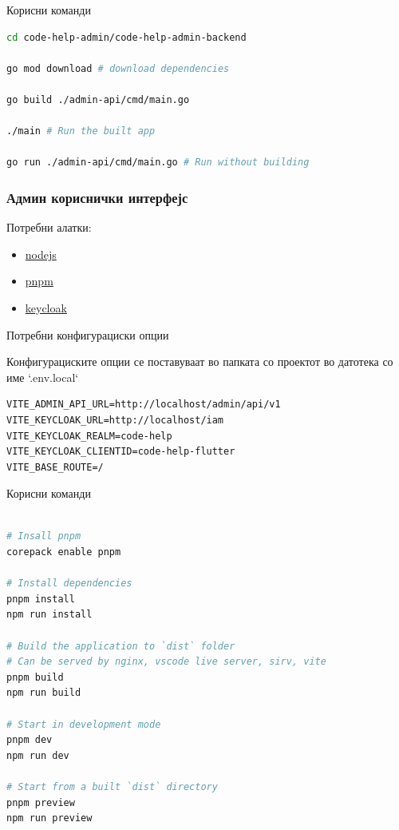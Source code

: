 \documentclass{article}
\begin{document}
Корисни команди
\begin{lstlisting}[language=sh]
cd code-help-admin/code-help-admin-backend

go mod download # download dependencies

go build ./admin-api/cmd/main.go

./main # Run the built app

go run ./admin-api/cmd/main.go # Run without building

\end{lstlisting}

\subsubsection{Админ кориснички интерфејс}

Потребни алатки:
\begin{itemize}
\item \href{https://nodejs.org/en}{nodejs}
\item \href{https://pnpm.io/installation}{pnpm}
\item \href{https://www.keycloak.org/}{keycloak}
\end{itemize}

Потребни конфигурациски опции

Конфигурациските опции се поставуваат во папката со проектот во датотека со име `.env.local`


\begin{lstlisting}[language=.env]
VITE_ADMIN_API_URL=http://localhost/admin/api/v1  
VITE_KEYCLOAK_URL=http://localhost/iam  
VITE_KEYCLOAK_REALM=code-help  
VITE_KEYCLOAK_CLIENTID=code-help-flutter  
VITE_BASE_ROUTE=/
\end{lstlisting}

Корисни команди
\begin{lstlisting}[language=sh]

# Insall pnpm
corepack enable pnpm 

# Install dependencies
pnpm install
npm run install

# Build the application to `dist` folder
# Can be served by nginx, vscode live server, sirv, vite
pnpm build
npm run build

# Start in development mode
pnpm dev
npm run dev

# Start from a built `dist` directory
pnpm preview
npm run preview

\end{lstlisting}
\end{document}
